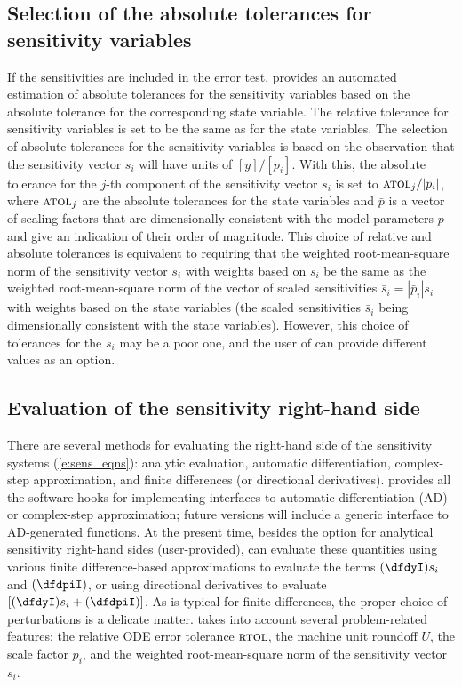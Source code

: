 \subsection{Selection of the absolute tolerances for sensitivity variables}
If the sensitivities are included in the error
test, {\cvodes} provides an
automated estimation of absolute tolerances for the sensitivity variables 
based on the absolute tolerance for the corresponding state variable.
The relative tolerance for sensitivity variables is set to be the same as for 
the state variables. The selection of absolute tolerances for the sensitivity 
variables is based on the observation that the sensitivity vector $s_i$ will have 
units of $[y]/[p_i]$.
With this, the absolute tolerance for the $j$-th component of the sensitivity
vector $s_i$ is set to ${\mbox{\sc atol}_j}/{|{\bar p}_i|}$, where
$\mbox{\sc atol}_j$ are the absolute tolerances for the state variables and $\bar p$
is a vector of scaling factors that are dimensionally consistent with
the model parameters $p$ and give an indication of their order of magnitude.
This choice of relative and absolute tolerances is equivalent 
to requiring that the weighted root-mean-square norm of the sensitivity 
vector $s_i$ with weights based on $s_i$ be the same as the
weighted root-mean-square norm of the vector of scaled sensitivities 
${\bar s}_i = |{\bar p}_i| s_i$ with weights based on the state variables
(the scaled sensitivities ${\bar s}_i$ being dimensionally consistent with the
state variables).
%
However, this choice of tolerances for the $s_i$ may be a poor one, and the user 
of {\cvodes} can provide different values as an option.

\subsection{Evaluation of the sensitivity right-hand side}
There are several methods for evaluating the right-hand side of the sensitivity 
systems (\ref{e:sens_eqns}): analytic evaluation, automatic differentiation, 
complex-step approximation, and finite differences (or directional derivatives).
{\cvodes} provides all the software hooks for implementing interfaces to
automatic differentiation (AD) or complex-step approximation; future versions
will include a generic interface to AD-generated functions.
At the present time, besides the option for analytical sensitivity right-hand 
sides (user-provided), {\cvodes} can evaluate these quantities using various
finite difference-based approximations to evaluate the terms $(\dfdyI) s_i$ 
and $(\dfdpiI)$, or using directional derivatives to evaluate
$\left[ (\dfdyI) s_i + (\dfdpiI) \right]$.
As is typical for finite differences, the proper choice of perturbations is a 
delicate matter. {\cvodes} takes into account several problem-related features:
the relative ODE error tolerance $\mbox{\sc rtol}$, the machine unit roundoff $U$,
the scale factor ${\bar p}_i$, and the weighted root-mean-square norm of the 
sensitivity vector $s_i$.

